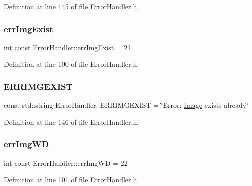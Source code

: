 Definition at line 145 of file Error\+Handler.\+h.

\mbox{\label{classErrorHandler_a53571f96a023b3af97618425aaf169a6}} 
\subsubsection{\texorpdfstring{errImgExist}{errImgExist}}
{\footnotesize\ttfamily int const Error\+Handler\+::err\+Img\+Exist = 21\hspace{0.3cm}{\ttfamily [static]}}



Definition at line 100 of file Error\+Handler.\+h.

\mbox{\label{classErrorHandler_a32d9d3b8749844fa07ce891edea63286}} 
\subsubsection{\texorpdfstring{ERRIMGEXIST}{ERRIMGEXIST}}
{\footnotesize\ttfamily const std\+::string Error\+Handler\+::\+E\+R\+R\+I\+M\+G\+E\+X\+I\+ST = \char`\"{}Error\+: \mbox{\hyperlink{classImage}{Image}} exists already\char`\"{}\hspace{0.3cm}{\ttfamily [static]}}



Definition at line 146 of file Error\+Handler.\+h.

\mbox{\label{classErrorHandler_afe6bbe690173284ff3f3adb889c036d8}} 
\subsubsection{\texorpdfstring{errImgWD}{errImgWD}}
{\footnotesize\ttfamily int const Error\+Handler\+::err\+Img\+WD = 22\hspace{0.3cm}{\ttfamily [static]}}



Definition at line 101 of file Error\+Handler.\+h.

\mbox{\label{classErrorHandler_adf275e9080935450d46748424c788efa}} 

